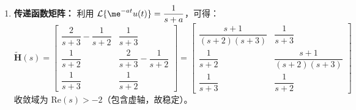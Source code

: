 \begin{example}[连续时间OC变换综合题]
\begin{enumerate}
        \item \textbf{传递函数矩阵：}
              利用 $\mathcal{L}\{\me^{-at}u(t)\} = \dfrac{1}{s+a}$，可得：
              \begin{equation}
                  \tilde{\mathbf{H}}(s) = \begin{bmatrix}
                      \dfrac{2}{s+3} - \dfrac{1}{s+2} & \dfrac{1}{s+3}                  \\
                      \dfrac{1}{s+2}                  & \dfrac{2}{s+3} - \dfrac{1}{s+2} \\
                      \dfrac{1}{s+3}                  & \dfrac{1}{s+2}
                  \end{bmatrix}
                  = \begin{bmatrix}
                      \dfrac{s+1}{(s+2)(s+3)} & \dfrac{1}{s+3}          \\
                      \dfrac{1}{s+2}          & \dfrac{s+1}{(s+2)(s+3)} \\
                      \dfrac{1}{s+3}          & \dfrac{1}{s+2}
                  \end{bmatrix}
              \end{equation}
              收敛域为 $\mathrm{Re}(s) > -2$（包含虚轴，故稳定）。


\end{enumerate}
\end{example}
